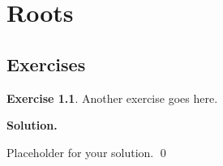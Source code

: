 \documentclass[12pt]{book}
\theoremstyle{definition}
\newtheorem{exercise}{Exercise}[chapter]
\newenvironment{solution}
{%
  \par\noindent\textbf{Solution.}\quad
}
{%
  \qed\par
}
\begin{document}
\chapter{Roots}
\section{Exercises}

\begin{exercise}
Another exercise goes here.
\end{exercise}

\begin{solution}
Placeholder for your solution.
\end{solution}

\end{document}
